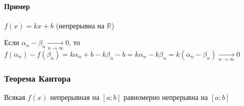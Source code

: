 \documentclass[class=article,a4paper,12pt,crop=false]{standalone}
\begin{document}
\paragraph{Пример} $f(x) = kx + b$ (непрерывна на $\mathbb{R}$)

Если $\alpha_n - \beta_n \underset{n \rightarrow \infty}{\rightarrow} 0$, то
$f(\alpha_n) - f(\beta_n) = k\alpha_n + b - k\beta_n - b = k\alpha_n - k\beta_n =
k(\alpha_n - \beta_n)
\underset{n \rightarrow \infty}{\rightarrow} 0$

\subsubsection{Теорема Кантора}

Всякая $f(x)$ непрерывная на $[a; b]$ равномерно непрерывна на $[a; b]$
\end{document}

